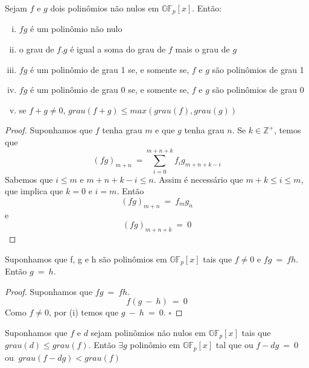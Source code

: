 \begin{theorem}
Sejam $f$ e $g$ dois polinômios não nulos em $\mathbb{GF}_p[x]$. Então:
  \begin{enumerate}[(i)]
     \item $fg$ é um polinômio não nulo
     \item o grau de $f.g$ é igual a soma do grau de $f$ mais o grau de $g$
     \item $fg$ é um polinômio de grau 1 se, e somente se, $f$ e $g$ são polinômios de grau 1
     \item $fg$ é um polinômio de grau 0 se, e somente se, $f$ e $g$ são polinômios de grau 0
     \item se $f+g \neq 0$, $grau(f+g) \leq max (grau(f), grau(g))$
  \end{enumerate}
\end{theorem}

\begin{proof}
Suponhamos que $f$ tenha grau $m$ e que $g$ tenha grau $n$. Se $k \in \mathbb{Z}^+$, temos que
$$
(fg)_{m+n}\ = \displaystyle\sum_{i=0}^{m+n+k} f_i g_{m+n+k-i}
$$
Sabemos que $i \leq m$ e $m+n+k-i \leq n$. Assim é necessário que $m+k \leq i \leq m$, que implica que $k=0$ e $i=m$. Então
$$
(fg)_{m+n}\ =\ f_m g_n
$$
e
$$
(fg)_{m+n+k}\ =\ 0
$$
\end{proof}

\begin{corollary} Suponhamos que f, g e h são polinômios em $\mathbb{GF}_p[x]$ tais que $f \neq 0$ e $fg\ =\ fh$. Então $g\ =\ h$.
\end{corollary}

\begin{proof} Suponhamos que $fg\ =\ fh$.
$$
f(g\ -\ h)\ =\ 0
$$
Como $f \neq 0$, por (i) temos que $g\ -\ h\ =\ 0$. $\square$
\end{proof}

\begin{lemma} \label{lema1} Suponhamos que $f$ e $d$ sejam polinômios não nulos em $\mathbb{GF}_p[x]$ tais que $grau(d) \leq grau(f)$. Então $\exists g$ polinômio em $\mathbb{GF}_p[x]$ tal que ou $f-dg\ =\ 0$ ou  $\ grau(f-dg) < grau(f)$
\end{lemma}

